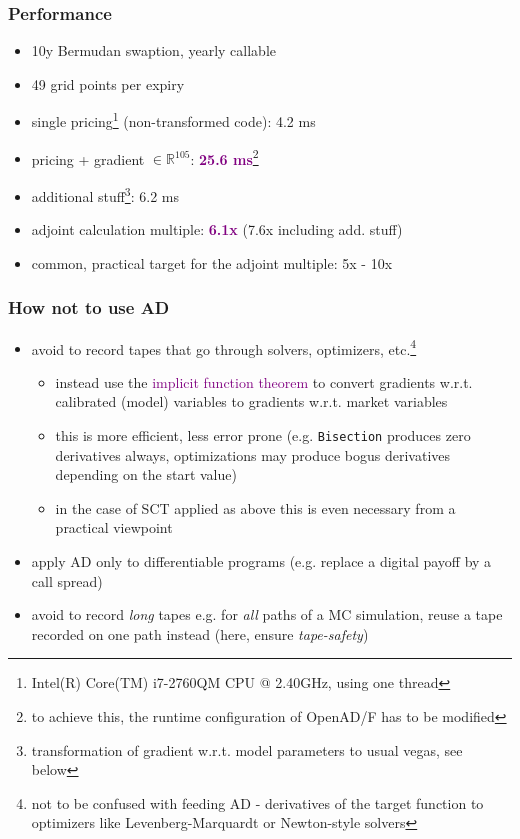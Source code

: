 \documentclass[10pt,German]{beamer}
\begin{document}
\begin{frame}[fragile]
\frametitle{Performance}
\begin{itemize}
\item 10y Bermudan swaption, yearly callable
\item 49 grid points per expiry
\item single pricing\footnote{Intel(R) Core(TM) i7-2760QM CPU @ 2.40GHz, using one thread} (non-transformed code): 4.2 ms
\item pricing + gradient $\in \mathbb{R}^{105}$: \textcolor{purple}{\textbf{25.6 ms}}\footnote{to achieve this, the runtime configuration of OpenAD/F has to be modified}
\item additional stuff\footnote{transformation of gradient w.r.t. model parameters to usual vegas, see below}: 6.2 ms
\item adjoint calculation multiple: \textcolor{purple}{\textbf{6.1x}} (7.6x including add. stuff)
\item common, practical target for the adjoint multiple: 5x - 10x
\end{itemize}
\end{frame}

\begin{frame}[fragile]
\frametitle{How not to use AD}
\begin{itemize}
\item avoid to record tapes that go through solvers, optimizers, etc.\footnote{not to be confused with feeding AD - derivatives of the target function to optimizers like Levenberg-Marquardt or Newton-style solvers}
\begin{itemize}
\item instead use the \textcolor{purple}{implicit function theorem} to convert gradients w.r.t. calibrated (model) variables to gradients w.r.t. market variables
\item this is more efficient, less error prone (e.g. \verb+Bisection+ produces zero derivatives always, optimizations may produce bogus derivatives depending on the start value)
\item in the case of SCT applied as above this is even necessary from a practical viewpoint
\end{itemize}
\item apply AD only to differentiable programs (e.g. replace a digital payoff by a call spread)
\item avoid to record \textit{long} tapes e.g. for \textit{all} paths of a MC simulation, reuse a tape recorded on one path instead (here, ensure \textit{tape-safety})
\end{itemize}
\end{frame}
\end{document}
